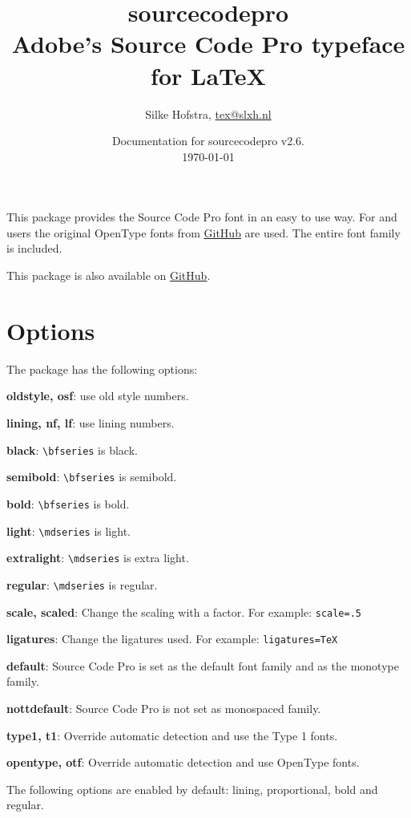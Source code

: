 \documentclass[10pt,a4paper,english]{article}
\title{\bfseries
	\Huge sourcecodepro\\
	\Large Adobe's Source Code Pro typeface for \LaTeX
}
\author{Silke Hofstra, \href{mailto:tex@slxh.nl}{tex@slxh.nl}}
\date{Documentation for sourcecodepro v2.6.\\ \today}
\begin{document}
\maketitle
\begin{multicols}{2}
This package provides the Source Code Pro font in an easy to use way. For  and  users the original OpenType fonts from \href{https://github.com/adobe-fonts/source-code-pro}{GitHub} are used. The entire font family is included.

This package is also available on \href{https://github.com/silkeh/latex-sourcecodepro}{GitHub}.

\section{Options}
The package has the following options:
\begin{itemize*}
	\item \textbf{oldstyle, osf}:  use old style numbers.
	\item \textbf{lining, nf, lf}: use lining numbers.
	\item \textbf{black}:          \texttt{\textbackslash bfseries} is black.
	\item \textbf{semibold}:       \texttt{\textbackslash bfseries} is semibold.
	\item \textbf{bold}:           \texttt{\textbackslash bfseries} is bold.
	\item \textbf{light}:          \texttt{\textbackslash mdseries} is light.
	\item \textbf{extralight}:     \texttt{\textbackslash mdseries} is extra light.
	\item \textbf{regular}:        \texttt{\textbackslash mdseries} is regular.
	\item \textbf{scale, scaled}:  Change the scaling with a factor. For example:  \texttt{scale=.5}
	\item \textbf{ligatures}:      Change the ligatures used. For example: \texttt{ligatures=TeX}
	\item \textbf{default}:        Source Code Pro is set as the default font family and as the monotype family.
	\item \textbf{nottdefault}:    Source Code Pro is not set as monospaced family.
	\item \textbf{type1, t1}:      Override automatic detection and use the Type 1 fonts.
	\item \textbf{opentype, otf}:  Override automatic detection and use OpenType fonts.
\end{itemize*}
The following options are enabled by default: lining, proportional, bold and regular.


\end{multicols}
\end{document}

